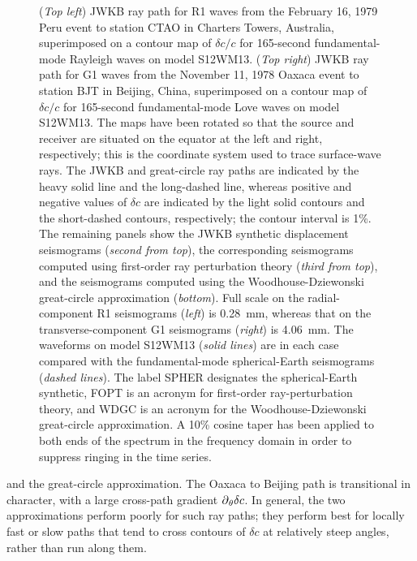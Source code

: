 \begin{figure}[!t]
\begin{center}
\end{center}
\caption[comparison]{\label{fig:16.comparison}
({\em Top left\/}) JWKB ray path for R1 waves from the
February 16, 1979 Peru event to station CTAO in Charters Towers,
Australia, superimposed on a contour map of $\delta c/c$ for
165-second fundamental-mode Rayleigh waves on model S12WM13.
({\em Top right\/}) JWKB ray path for G1 waves from the November 11,
1978 Oaxaca event to station BJT in Beijing, China,
superimposed on a contour map of $\delta c/c$ for
165-second fundamental-mode Love waves on model S12WM13.
The maps have been rotated so that the source and receiver are
situated on the equator at the left and right, respectively;
this is the coordinate system used to trace surface-wave rays.
The JWKB and great-circle ray paths are indicated by the heavy
solid line and the long-dashed line, whereas positive and negative
values of $\delta c$ are indicated by the light solid contours and
the short-dashed contours, respectively; the contour interval is 1\%.
The remaining panels show the JWKB synthetic displacement seismograms
({\em second from top\/}), the corresponding seismograms computed using
first-order ray perturbation theory ({\em third from top\/}), and the
seismograms computed using the Woodhouse-Dziewonski great-circle
approximation ({\em bottom\/}).  Full scale on the radial-component
R1 seismograms ({\em left\/}) is 0.28~mm, whereas that on the
transverse-component G1 seismograms ({\em right\/}) is 4.06~mm.
The waveforms on
model S12WM13 ({\em solid lines\/}) are in each case compared with
the fundamental-mode spherical-Earth seismograms ({\em dashed lines\/}).
The label SPHER designates the spherical-Earth synthetic,
FOPT is an acronym for first-order ray-perturbation theory,
and WDGC is an acronym for the Woodhouse-Dziewonski great-circle
approximation. A 10\% cosine taper has been applied to both ends of
the spectrum in the frequency domain in order to suppress ringing
in the time series.}
\end{figure}
and the great-circle approximation.  The Oaxaca to Beijing path is
transitional in character, with a large cross-path gradient
$\mbox{$\partial$}_{\theta}\delta c$.  In general, the two approximations
perform poorly for such ray paths; they perform best for locally
fast or slow paths that tend to cross contours of $\delta c$
%
%
%
%
%
at relatively steep angles, rather than run along them.

